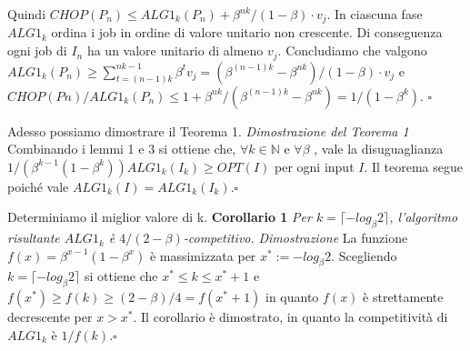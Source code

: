 \documentclass[12pt]{article}
\newcommand*{\N}{\mathbb{N}}
\begin{document}
Quindi $CHOP(P_{n}) \leq ALG1_{k}(P_{n})+\beta^{nk}/(1-\beta ) \cdot v_{j}$. In ciascuna fase $ALG1_{k}$ ordina i job in ordine di valore unitario non crescente. Di conseguenza ogni job di $I_{n}$ ha un valore unitario di almeno $v_{j}$. Concludiamo che valgono $ALG1_{k}(P_{n}) \geq \sum^{nk-1}_{t=(n-1)k} \beta^{t} v_{j} = (\beta^{(n-1)k} - \beta^{nk})/(1 -\beta ) \cdot v_{j}$ e $CHOP(Pn)/ALG1_{k}(P_{n}) \leq 1 + \beta^{nk}/(\beta^{(n-1)k} - \beta^{nk} ) = 1/(1 - \beta^{k})$. \hfill $\square$ \vspace{5mm}

Adesso possiamo dimostrare il Teorema 1.\newline \newline
\textit{Dimostrazione del Teorema 1} Combinando i lemmi 1 e 3 si ottiene che, $\forall k \in \N$ e $\forall \beta$ , vale la disuguaglianza $1/(\beta^{k-1}(1 - \beta^{k}))ALG1_{k}(I_{k}) \geq OPT(I)$ per ogni input $I$. Il teorema segue poiché vale $ALG1_{k}(I) = ALG1_{k}(I_{k})$.\hfill $\square$ \vspace{5mm}

Determiniamo il miglior valore di k.\newline \newline
\textbf{Corollario 1} 
\textit{Per $k = \lceil-log_{\beta} 2\rceil$, l'algoritmo risultante $ALG1_{k}$ è $4 / (2 - \beta )$-competitivo.} \newline\newline
\textit{Dimostrazione}
La funzione $f(x) = \beta^{x - 1}(1 - \beta^{x})$ è massimizzata per $x^{*} := - log_{\beta}2$. Scegliendo $k = \lceil-log_{\beta} 2\rceil$ si ottiene che $x^{*} \leq k \leq x^{*} + 1$ e $f (x^{*}) \geq f (k) \geq (2 - \beta )/4 = f (x^{*} + 1)$ in quanto $f(x)$ è strettamente decrescente per $x > x^{*}$. Il corollario è dimostrato, in quanto la competitività di $ALG1_{k}$ è $1 / f (k)$.\hfill $\square$ \vspace{5mm}
\end{document}
